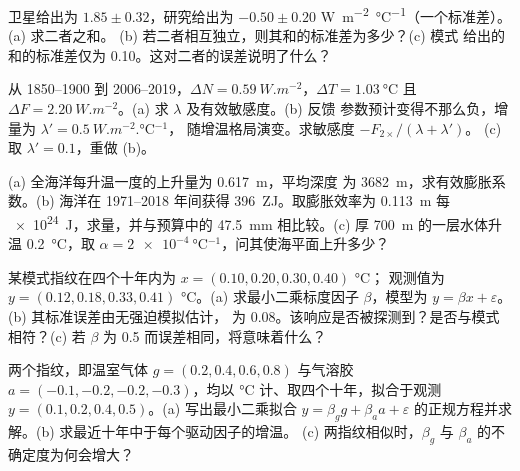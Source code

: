 \begin{exercise}[$\star\star$]\label{exo:b2:anthropogenic-climate-change:6}
卫星给出为 $1.85 \pm 0.32$，研究给出为
$-0.50 \pm 0.20$ \unit{W.m^{-2}.\celsius^{-1}}（一个标准差）。(a) 求二者之和。
(b) 若二者相互独立，则其和的标准差为多少？(c) 模式
给出的和的标准差仅为 \num{0.10}。这对二者的误差说明了什么？
\end{exercise}

\begin{exercise}[$\star\star$]\label{exo:b2:anthropogenic-climate-change:7}
从 1850--1900 到 2006--2019，$\Delta N = \qty{0.59}{W.m^{-2}}$，$\Delta T = \qty{1.03}{\celsius}$
且 $\Delta F = \qty{2.20}{W.m^{-2}}$。(a) 求 $\lambda$ 及有效敏感度。(b) 反馈
参数预计变得不那么负，增量为 $\lambda' = \qty{0.5}{W.m^{-2}.\celsius^{-1}}$，
随增温格局演变。求敏感度 $-F_{2\times}/(\lambda + \lambda')$。
(c) 取 $\lambda' = 0.1$，重做 (b)。
\end{exercise}

\begin{exercise}[$\star\star$]\label{exo:b2:anthropogenic-climate-change:8}
(a) 全海洋每升温一度的上升量为 \qty{0.617}{m}，平均深度
为 \qty{3682}{m}，求有效膨胀系数。(b) 海洋在
1971--2018 年间获得 \qty{396}{ZJ}。取膨胀效率为 \qty{0.113}{m} 每 \qty{e24}{J}，求量，并与预算中的 \qty{47.5}{mm} 相比较。(c) 厚 \qty{700}{m} 的一层水体升温
\qty{0.2}{\celsius}，取 $\alpha = \qty{2e-4}{\celsius^{-1}}$，问其使海平面上升多少？
\end{exercise}

\begin{exercise}[$\star\star$]\label{exo:b2:anthropogenic-climate-change:9}
某模式指纹在四个十年内为 $x = (0.10, 0.20, 0.30, 0.40)$ \unit{\celsius}；
观测值为 $y = (0.12, 0.18, 0.33, 0.41)$ \unit{\celsius}。(a) 求最小二乘标度因子
$\beta$，模型为 $y = \beta x + \varepsilon$。(b) 其标准误差由无强迫模拟估计，
为 \num{0.08}。该响应是否被探测到？是否与模式相符？(c) 若
$\beta$ 为 0.5 而误差相同，将意味着什么？
\end{exercise}

\begin{exercise}[$\star\star\star$]\label{exo:b2:anthropogenic-climate-change:10}
两个指纹，即温室气体 $g = (0.2, 0.4, 0.6, 0.8)$ 与气溶胶 $a = (-0.1, -0.2,
-0.2, -0.3)$，均以 \unit{\celsius} 计、取四个十年，拟合于观测 $y = (0.1,
0.2, 0.4, 0.5)$。(a) 写出最小二乘拟合 $y = \beta_g g + \beta_a a
+ \varepsilon$ 的正规方程并求解。(b) 求最近十年中于每个驱动因子的增温。
(c) 两指纹相似时，$\beta_g$ 与 $\beta_a$ 的不确定度为何会增大？
\end{exercise}


